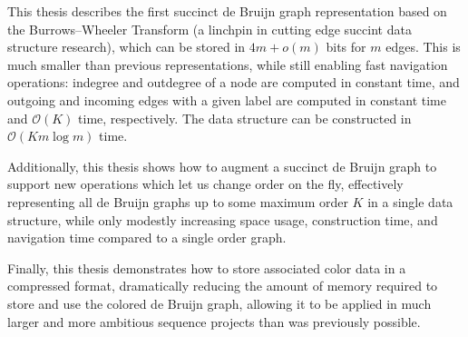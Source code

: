 
This thesis describes the first succinct de Bruijn graph representation based on the Burrows--Wheeler Transform
(a linchpin in cutting edge succint data structure research), which can be stored in $4m + o(m)$ bits for $m$
edges. This is much smaller than previous representations, while still enabling fast navigation operations:
indegree and outdegree of a node are computed in constant time, and outgoing and incoming edges with a given
label are computed in constant time and $\mathcal{O}(K)$ time, respectively. The data structure can be
constructed in $\mathcal{O}(K m \log{m})$ time.

Additionally, this thesis shows how to augment a succinct de Bruijn graph to support new operations which let
us change order on the fly, effectively representing all de Bruijn graphs up to some maximum order $K$ in a single
data structure, while only modestly increasing space usage, construction time, and navigation time compared
to a single order graph.

Finally, this thesis demonstrates how to store associated color data in a compressed format, dramatically reducing the amount
of memory required to store and use the colored de Bruijn graph, allowing it to be applied in much larger and more ambitious
sequence projects than was previously possible.

